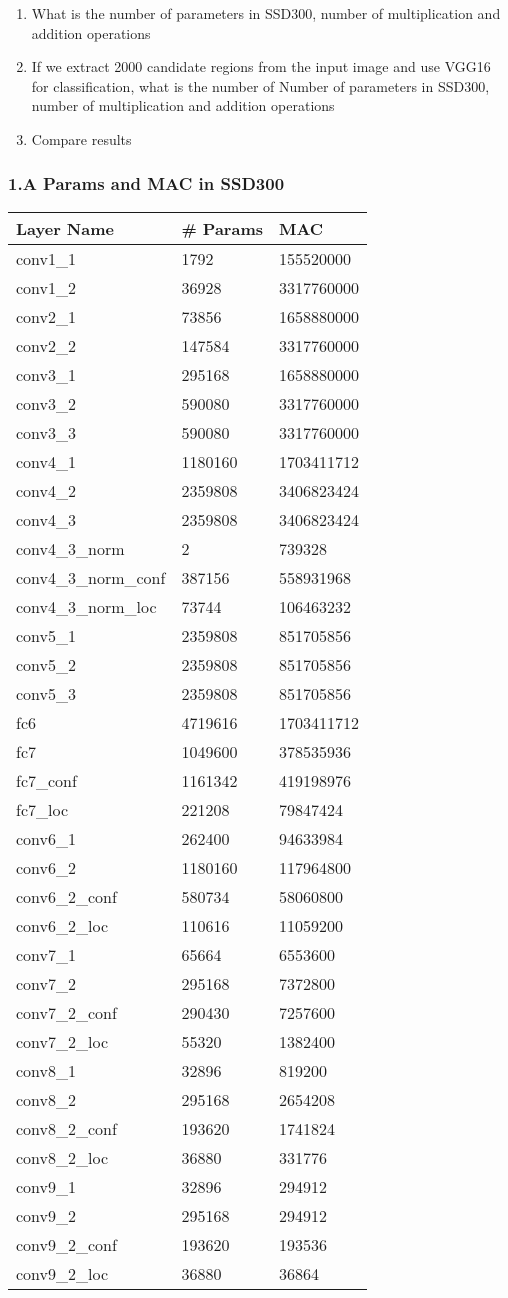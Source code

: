 \documentclass[11pt]{article}
\providecommand{\tightlist}{%
      \setlength{\itemsep}{0pt}\setlength{\parskip}{0pt}}
\begin{document}
\begin{enumerate}
\def\labelenumi{\arabic{enumi}.}
\tightlist
\item
  What is the number of parameters in SSD300, number of multiplication
  and addition operations
\item
  If we extract 2000 candidate regions from the input image and use
  VGG16 for classification, what is the number of Number of parameters
  in SSD300, number of multiplication and addition operations
\item
  Compare results
\end{enumerate}

    \hypertarget{a-params-and-mac-in-ssd300}{%
\subsubsection{1.A Params and MAC in
SSD300}\label{a-params-and-mac-in-ssd300}}

\begin{longtable}[]{@{}lll@{}}
\toprule
Layer Name & \# Params & MAC\tabularnewline
\midrule
\endhead
conv1\_1 & 1792 & 155520000\tabularnewline
conv1\_2 & 36928 & 3317760000\tabularnewline
conv2\_1 & 73856 & 1658880000\tabularnewline
conv2\_2 & 147584 & 3317760000\tabularnewline
conv3\_1 & 295168 & 1658880000\tabularnewline
conv3\_2 & 590080 & 3317760000\tabularnewline
conv3\_3 & 590080 & 3317760000\tabularnewline
conv4\_1 & 1180160 & 1703411712\tabularnewline
conv4\_2 & 2359808 & 3406823424\tabularnewline
conv4\_3 & 2359808 & 3406823424\tabularnewline
conv4\_3\_norm & 2 & 739328\tabularnewline
conv4\_3\_norm\_conf & 387156 & 558931968\tabularnewline
conv4\_3\_norm\_loc & 73744 & 106463232\tabularnewline
conv5\_1 & 2359808 & 851705856\tabularnewline
conv5\_2 & 2359808 & 851705856\tabularnewline
conv5\_3 & 2359808 & 851705856\tabularnewline
fc6 & 4719616 & 1703411712\tabularnewline
fc7 & 1049600 & 378535936\tabularnewline
fc7\_conf & 1161342 & 419198976\tabularnewline
fc7\_loc & 221208 & 79847424\tabularnewline
conv6\_1 & 262400 & 94633984\tabularnewline
conv6\_2 & 1180160 & 117964800\tabularnewline
conv6\_2\_conf & 580734 & 58060800\tabularnewline
conv6\_2\_loc & 110616 & 11059200\tabularnewline
conv7\_1 & 65664 & 6553600\tabularnewline
conv7\_2 & 295168 & 7372800\tabularnewline
conv7\_2\_conf & 290430 & 7257600\tabularnewline
conv7\_2\_loc & 55320 & 1382400\tabularnewline
conv8\_1 & 32896 & 819200\tabularnewline
conv8\_2 & 295168 & 2654208\tabularnewline
conv8\_2\_conf & 193620 & 1741824\tabularnewline
conv8\_2\_loc & 36880 & 331776\tabularnewline
conv9\_1 & 32896 & 294912\tabularnewline
conv9\_2 & 295168 & 294912\tabularnewline
conv9\_2\_conf & 193620 & 193536\tabularnewline
conv9\_2\_loc & 36880 & 36864\tabularnewline
\bottomrule
\end{longtable}
\end{document}
